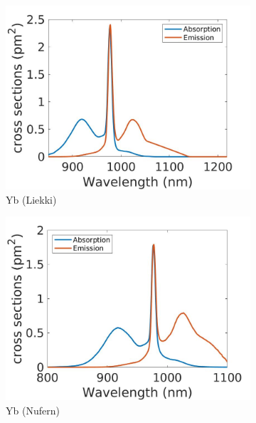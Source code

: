 \documentclass[12pt,hidelinks]{book}
\begin{document}
\begin{description}
\begin{figure}[h!]
\centering
\begin{subfigure}{0.3\textwidth}
\centering
\includegraphics[width=\textwidth]{Yb (Liekki).jpg}
\caption{Yb (Liekki)}
\end{subfigure}
\begin{subfigure}{0.3\textwidth}
\centering
\includegraphics[width=\textwidth]{Yb (Nufern).jpg}
\caption{Yb (Nufern)}
\end{subfigure}
\begin{subfigure}{0.3\textwidth}
\centering

\end{subfigure}
\end{figure}
\end{description}
\end{document}
